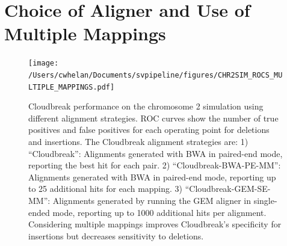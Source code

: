 \section{Choice of Aligner and Use of Multiple Mappings}\label{section_multiple_mappings_eval}

\begin{figure}
\centering
\texttt{[image: /Users/cwhelan/Documents/svpipeline/figures/CHR2SIM\_ROCS\_MULTIPLE\_MAPPINGS.pdf]}
\caption{Cloudbreak performance on the chromosome 2 simulation using different alignment strategies. ROC curves show the number of true positives and false positives for each operating point for deletions and insertions. The Cloudbreak alignment strategies are: 1) ``Cloudbreak'': Alignments generated with BWA in paired-end mode, reporting the best hit for each pair. 2) ``Cloudbreak-BWA-PE-MM'': Alignments generated with BWA in paired-end mode, reporting up to 25 additional hits for each mapping. 3) ``Cloudbreak-GEM-SE-MM'': Alignments generated by running the GEM aligner in single-ended mode, reporting up to 1000 additional hits per alignment. Considering multiple mappings improves Cloudbreak's specificity for insertions but decreases sensitivity to deletions.}
\label{alignment_comparison}
\end{figure}

